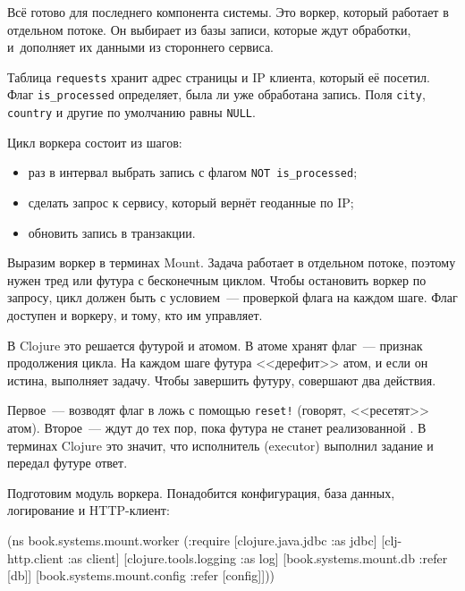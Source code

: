 \label{worker}

Всё готово для последнего компонента системы. Это воркер, который работает в
отдельном потоке. Он выбирает из базы записи, которые ждут обработки,
и~дополняет их данными из стороннего сервиса.

Таблица \verb|requests| хранит адрес страницы и IP клиента, который её
посетил. Флаг \verb|is_processed| определяет, была ли уже обработана
запись. Поля \verb|city|, \verb|country| и другие по умолчанию равны
\verb|NULL|.


Цикл воркера состоит из шагов:

\begin{itemize}

\item
  раз в интервал выбрать запись с флагом \verb|NOT is_processed|;

\item
  сделать запрос к сервису, который вернёт геоданные по IP;

\item
  обновить запись в транзакции.

\end{itemize}

Выразим воркер в терминах Mount. Задача работает в отдельном потоке, поэтому
нужен тред или футура с бесконечным циклом. Чтобы остановить воркер по запросу,
цикл должен быть с условием~--- проверкой флага на каждом шаге. Флаг доступен и
воркеру, и тому, кто им управляет.


В Clojure это решается футурой и атомом. В атоме хранят флаг~--- признак
продолжения цикла. На каждом шаге футура <<дерефит>> атом, и если он истина,
выполняет задачу. Чтобы завершить футуру, совершают два действия.

Первое~--- возводят флаг в ложь с помощью \verb|reset!| (говорят, <<ресетят>>
атом). Второе~--- ждут до тех пор, пока футура не станет реализованной
. В терминах Clojure это значит, что исполнитель (executor)
выполнил задание и передал футуре ответ.

Подготовим модуль воркера. Понадобится конфигурация, база данных, логирование и
HTTP-клиент:

\ifx\DEVICETYPE\MOBILE

\begin{english}
  \begin{clojure}
(ns book.systems.mount.worker
  (:require
   [clojure.java.jdbc :as jdbc]
   [clj-http.client :as client]
   [clojure.tools.logging :as log]
   [book.systems.mount.db :refer [db]]
   [book.systems.mount.config
    :refer [config]]))
  \end{clojure}
\end{english}

